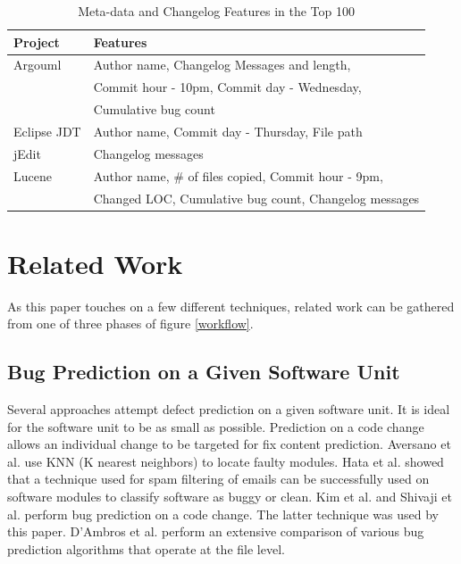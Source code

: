 \documentclass[journal,10pt,draftclsnofoot,twocolumn]{IEEEtran}
\begin{document}
\begin{table}[t]
\caption{Meta-data and Changelog Features in the Top 100}
\label{table:Top100Meta}
\begin{center}
\begin{tabular}{ll}

\hline
Project        & Features  \\ \hline
{\sc Argouml}   & Author name, Changelog  Messages and length, \\ & Commit hour - 10pm, Commit day - Wednesday, \\ &Cumulative bug count 	\\ \hline
{\sc Eclipse JDT}  & Author name, Commit day - Thursday, File path 	\\ \hline
{\sc jEdit}  & Changelog messages 	\\ \hline
{\sc Lucene}     & Author name, \# of files copied, Commit hour - 9pm, \\  & Changed LOC, Cumulative bug count, Changelog messages 	\\ \hline

\end{tabular}
\end{center}
\label{table:topFeatures}
\end{table}

\section{Related Work}
\label{RelatedWork}

\par As this paper touches on a few different techniques, related work can be gathered from one of three phases of figure \ref{workflow}. 


\subsection{Bug Prediction on a Given Software Unit} 
\par Several approaches attempt defect prediction on a given software unit. It is ideal for the software unit to be as small as possible. Prediction on a code change allows an individual change to be targeted for fix content prediction. Aversano et al. \cite{aversano2007lbi} use KNN (K nearest neighbors) to locate faulty modules.  Hata et al. \cite{Hata2008} showed that a technique used for spam filtering of emails can be successfully used on software modules to classify software as buggy or clean. Kim et al. \cite{Kim2007p58} and Shivaji et al. \cite{shivaji2009reducing} perform bug prediction on a code change. The latter technique was used by this paper. D'Ambros et al. \cite{d2011evaluating} perform an extensive comparison of various bug prediction algorithms that operate at the file level.
\end{document}
